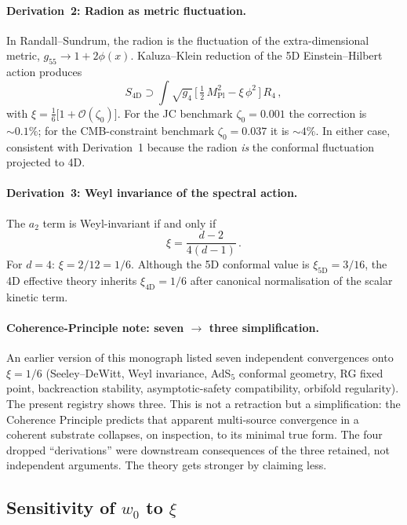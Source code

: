 \paragraph{Derivation~2: Radion as metric fluctuation.}
In Randall--Sundrum, the radion is the fluctuation of the extra-dimensional metric, $g_{55} \to 1 + 2\phi(x)$. Kaluza--Klein reduction of the 5D Einstein--Hilbert action produces
\begin{equation}
  S_{4\mathrm{D}} \supset \int\!\sqrt{g_4}\,\bigl[\,\tfrac{1}{2}\,M_{\mathrm{Pl}}^2 - \xi\,\phi^2\,\bigr]\,R_4\,,
\end{equation}
with $\xi = \frac{1}{6}\bigl[1 + \mathcal{O}(\zeta_0)\bigr]$. For the JC benchmark $\zeta_0 = 0.001$ the correction is $\sim\!0.1\%$; for the CMB-constraint benchmark $\zeta_0 = 0.037$ it is $\sim\!4\%$. In either case, consistent with Derivation~1 because the radion \emph{is} the conformal fluctuation projected to 4D.

\paragraph{Derivation~3: Weyl invariance of the spectral action.}
The $a_2$ term is Weyl-invariant if and only if
\begin{equation}
  \xi = \frac{d-2}{4(d-1)}\,.
  \label{eq:xi-weyl}
\end{equation}
For $d = 4$: $\xi = 2/12 = 1/6$. Although the 5D conformal value is $\xi_{5\mathrm{D}} = 3/16$, the 4D effective theory inherits $\xi_{4\mathrm{D}} = 1/6$ after canonical normalisation of the scalar kinetic term.

\paragraph{Coherence-Principle note: seven $\to$ three simplification.}
An earlier version of this monograph listed seven independent convergences onto $\xi = 1/6$ (Seeley--DeWitt, Weyl invariance, AdS$_5$ conformal geometry, RG fixed point, backreaction stability, asymptotic-safety compatibility, orbifold regularity). The present registry shows three. This is not a retraction but a simplification: the Coherence Principle predicts that apparent multi-source convergence in a coherent substrate collapses, on inspection, to its minimal true form. The four dropped ``derivations'' were downstream consequences of the three retained, not independent arguments. The theory gets stronger by claiming less.

\subsection{Sensitivity of $w_0$ to $\xi$}

